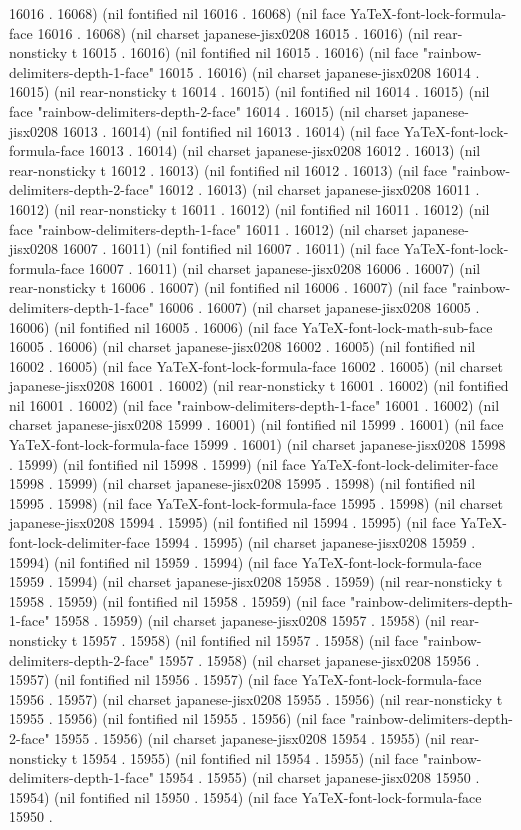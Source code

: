 16016 . 16068) (nil fontified nil 16016 . 16068) (nil face YaTeX-font-lock-formula-face 16016 . 16068) (nil charset japanese-jisx0208 16015 . 16016) (nil rear-nonsticky t 16015 . 16016) (nil fontified nil 16015 . 16016) (nil face "rainbow-delimiters-depth-1-face" 16015 . 16016) (nil charset japanese-jisx0208 16014 . 16015) (nil rear-nonsticky t 16014 . 16015) (nil fontified nil 16014 . 16015) (nil face "rainbow-delimiters-depth-2-face" 16014 . 16015) (nil charset japanese-jisx0208 16013 . 16014) (nil fontified nil 16013 . 16014) (nil face YaTeX-font-lock-formula-face 16013 . 16014) (nil charset japanese-jisx0208 16012 . 16013) (nil rear-nonsticky t 16012 . 16013) (nil fontified nil 16012 . 16013) (nil face "rainbow-delimiters-depth-2-face" 16012 . 16013) (nil charset japanese-jisx0208 16011 . 16012) (nil rear-nonsticky t 16011 . 16012) (nil fontified nil 16011 . 16012) (nil face "rainbow-delimiters-depth-1-face" 16011 . 16012) (nil charset japanese-jisx0208 16007 . 16011) (nil fontified nil 16007 . 16011) (nil face YaTeX-font-lock-formula-face 16007 . 16011) (nil charset japanese-jisx0208 16006 . 16007) (nil rear-nonsticky t 16006 . 16007) (nil fontified nil 16006 . 16007) (nil face "rainbow-delimiters-depth-1-face" 16006 . 16007) (nil charset japanese-jisx0208 16005 . 16006) (nil fontified nil 16005 . 16006) (nil face YaTeX-font-lock-math-sub-face 16005 . 16006) (nil charset japanese-jisx0208 16002 . 16005) (nil fontified nil 16002 . 16005) (nil face YaTeX-font-lock-formula-face 16002 . 16005) (nil charset japanese-jisx0208 16001 . 16002) (nil rear-nonsticky t 16001 . 16002) (nil fontified nil 16001 . 16002) (nil face "rainbow-delimiters-depth-1-face" 16001 . 16002) (nil charset japanese-jisx0208 15999 . 16001) (nil fontified nil 15999 . 16001) (nil face YaTeX-font-lock-formula-face 15999 . 16001) (nil charset japanese-jisx0208 15998 . 15999) (nil fontified nil 15998 . 15999) (nil face YaTeX-font-lock-delimiter-face 15998 . 15999) (nil charset japanese-jisx0208 15995 . 15998) (nil fontified nil 15995 . 15998) (nil face YaTeX-font-lock-formula-face 15995 . 15998) (nil charset japanese-jisx0208 15994 . 15995) (nil fontified nil 15994 . 15995) (nil face YaTeX-font-lock-delimiter-face 15994 . 15995) (nil charset japanese-jisx0208 15959 . 15994) (nil fontified nil 15959 . 15994) (nil face YaTeX-font-lock-formula-face 15959 . 15994) (nil charset japanese-jisx0208 15958 . 15959) (nil rear-nonsticky t 15958 . 15959) (nil fontified nil 15958 . 15959) (nil face "rainbow-delimiters-depth-1-face" 15958 . 15959) (nil charset japanese-jisx0208 15957 . 15958) (nil rear-nonsticky t 15957 . 15958) (nil fontified nil 15957 . 15958) (nil face "rainbow-delimiters-depth-2-face" 15957 . 15958) (nil charset japanese-jisx0208 15956 . 15957) (nil fontified nil 15956 . 15957) (nil face YaTeX-font-lock-formula-face 15956 . 15957) (nil charset japanese-jisx0208 15955 . 15956) (nil rear-nonsticky t 15955 . 15956) (nil fontified nil 15955 . 15956) (nil face "rainbow-delimiters-depth-2-face" 15955 . 15956) (nil charset japanese-jisx0208 15954 . 15955) (nil rear-nonsticky t 15954 . 15955) (nil fontified nil 15954 . 15955) (nil face "rainbow-delimiters-depth-1-face" 15954 . 15955) (nil charset japanese-jisx0208 15950 . 15954) (nil fontified nil 15950 . 15954) (nil face YaTeX-font-lock-formula-face 15950 . 